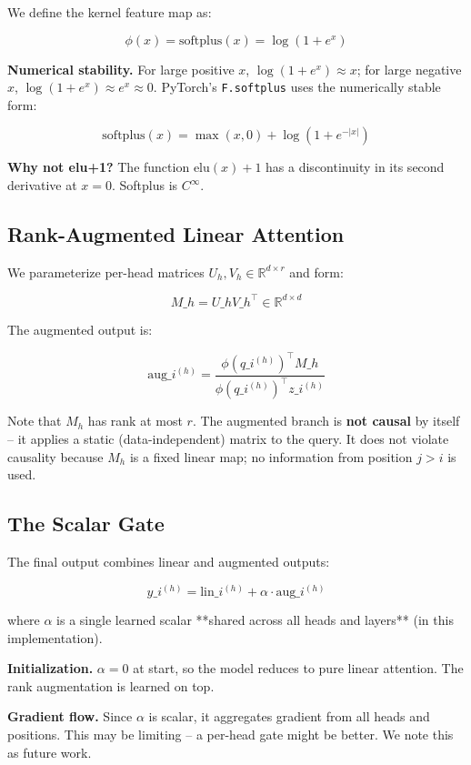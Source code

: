 We define the kernel feature map as:

\[
\phi(x) = \mathrm{softplus}(x) = \log(1 + e^x)
\tag{4.1}
\]

\textbf{Numerical stability.} For large positive $x$, $\log(1 + e^x) \approx x$; 
for large negative $x$, $\log(1 + e^x) \approx e^x \approx 0$. PyTorch's 
\texttt{F.softplus} uses the numerically stable form:

\[
\mathrm{softplus}(x) = \max(x, 0) + \log(1 + e^{-|x|})
\tag{4.2}
\]

\textbf{Why not elu+1?} The function $\mathrm{elu}(x) + 1$ has a discontinuity 
in its second derivative at $x = 0$. Softplus is $C^\infty$.

\subsection{Rank-Augmented Linear Attention}

We parameterize per-head matrices $U_h, V_h \in \mathbb{R}^{d \times r}$ and 
form:

\[
M\_h = U\_h V\_h^\top \in \mathbb{R}^{d \times d}
\tag{4.3}
\]

The augmented output is:

\[
\text{aug}\_i^{(h)} = \frac{\phi(q\_i^{(h)})^\top M\_h}{\phi(q\_i^{(h)})^\top z\_i^{(h)}}
\tag{4.4}
\]

Note that $M_h$ has rank at most $r$. The augmented branch is \textbf{not causal} 
by itself -- it applies a static (data-independent) matrix to the query. It 
does not violate causality because $M_h$ is a fixed linear map; no 
information from position $j > i$ is used.

\subsection{The Scalar Gate}

The final output combines linear and augmented outputs:

\[
y\_i^{(h)} = \text{lin}\_i^{(h)} + \alpha \cdot \text{aug}\_i^{(h)}
\tag{4.5}
\]

where $\alpha$ is a single learned scalar **shared across all heads and 
layers** (in this implementation).

\textbf{Initialization.} $\alpha = 0$ at start, so the model reduces to pure 
linear attention. The rank augmentation is learned on top.

\textbf{Gradient flow.} Since $\alpha$ is scalar, it aggregates gradient from all 
heads and positions. This may be limiting -- a per-head gate might be better. 
We note this as future work.

